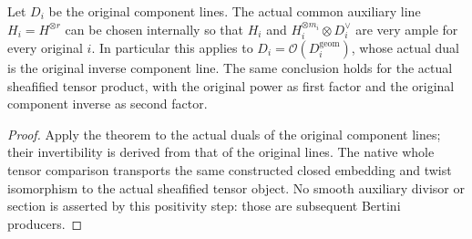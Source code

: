 \begin{corollary}
\label{cor:kn-nadel-auxiliary-component-powers}
\leanok
{}
Let $D_i$ be the original component lines. The actual common auxiliary
line $H_i=H^{\otimes r}$ can be chosen internally so that $H_i$ and
$H_i^{\otimes m_i}\otimes D_i^\vee$ are very ample for every original
$i$. In particular this applies to $D_i=\mathcal O(D_i^{\mathrm{geom}})$,
whose actual dual is the original inverse component line.
The same conclusion holds for the actual sheafified tensor product,
with the original power as first factor and the original component
inverse as second factor.
\end{corollary}
\begin{proof}
Apply the theorem to the actual duals of the original component lines;
their invertibility is derived from that of the original lines. The
native whole tensor comparison transports the same constructed closed
embedding and twist isomorphism to the actual sheafified tensor object.
No smooth auxiliary divisor or section is asserted by this positivity
step: those are subsequent Bertini producers.
\end{proof}
